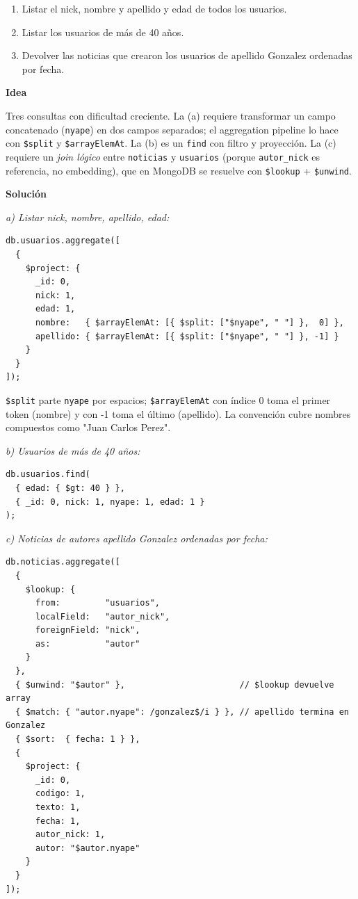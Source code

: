 \documentclass[11pt,a4paper]{article}
\newcommand{\itemcabecera}[1]{\noindent\textbf{#1}\par\medskip}
\newcommand{\bloqueIdea}{\itemcabecera{Idea}}
\newcommand{\bloqueSolucion}{\itemcabecera{Soluci\'on}}
\begin{document}
\begin{enumerate}[label=\alph*),leftmargin=*]
    \item Listar el nick, nombre y apellido y edad de todos los usuarios.
    \item Listar los usuarios de más de 40 años.
    \item Devolver las noticias que crearon los usuarios de apellido Gonzalez ordenadas por fecha.
\end{enumerate}

\bloqueIdea

Tres consultas con dificultad creciente. La (a) requiere transformar un campo concatenado (\texttt{nyape}) en dos campos separados; el aggregation pipeline lo hace con \texttt{\$split} y \texttt{\$arrayElemAt}. La (b) es un \texttt{find} con filtro y proyección. La (c) requiere un \emph{join lógico} entre \texttt{noticias} y \texttt{usuarios} (porque \texttt{autor\_nick} es referencia, no embedding), que en MongoDB se resuelve con \texttt{\$lookup} + \texttt{\$unwind}.

\bloqueSolucion

\textit{a) Listar nick, nombre, apellido, edad:}

\begin{lstlisting}
db.usuarios.aggregate([
  {
    $project: {
      _id: 0,
      nick: 1,
      edad: 1,
      nombre:   { $arrayElemAt: [{ $split: ["$nyape", " "] },  0] },
      apellido: { $arrayElemAt: [{ $split: ["$nyape", " "] }, -1] }
    }
  }
]);
\end{lstlisting}

\texttt{\$split} parte \texttt{nyape} por espacios; \texttt{\$arrayElemAt} con índice 0 toma el primer token (nombre) y con -1 toma el último (apellido). La convención cubre nombres compuestos como "Juan Carlos Perez".

\textit{b) Usuarios de más de 40 años:}

\begin{lstlisting}
db.usuarios.find(
  { edad: { $gt: 40 } },
  { _id: 0, nick: 1, nyape: 1, edad: 1 }
);
\end{lstlisting}

\textit{c) Noticias de autores apellido Gonzalez ordenadas por fecha:}

\begin{lstlisting}
db.noticias.aggregate([
  {
    $lookup: {
      from:         "usuarios",
      localField:   "autor_nick",
      foreignField: "nick",
      as:           "autor"
    }
  },
  { $unwind: "$autor" },                       // $lookup devuelve array
  { $match: { "autor.nyape": /gonzalez$/i } }, // apellido termina en Gonzalez
  { $sort:  { fecha: 1 } },
  {
    $project: {
      _id: 0,
      codigo: 1,
      texto: 1,
      fecha: 1,
      autor_nick: 1,
      autor: "$autor.nyape"
    }
  }
]);
\end{lstlisting}
\end{document}
